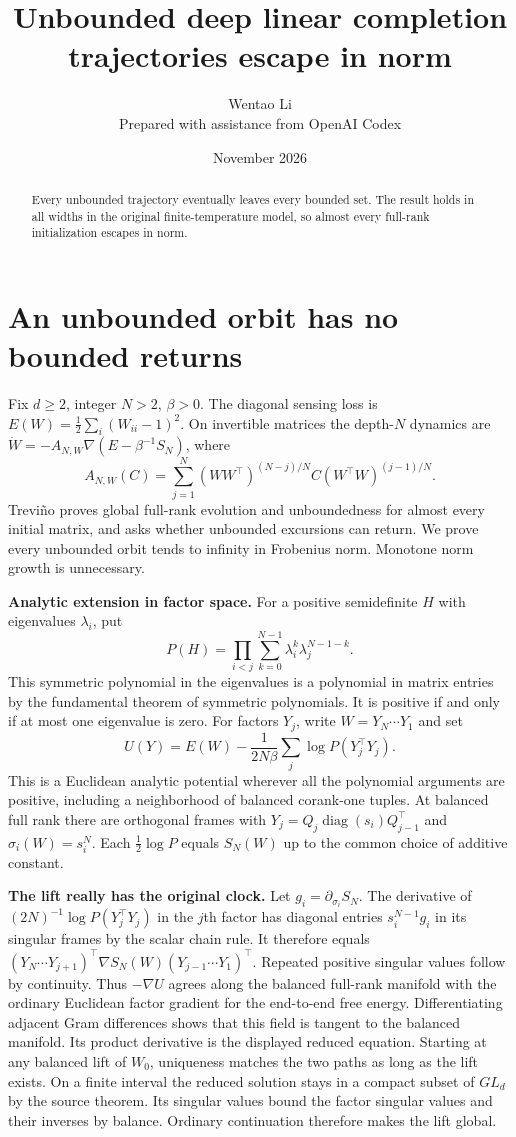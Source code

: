 \documentclass[10pt]{article}
\title{Unbounded deep linear completion trajectories escape in norm}
\author{Wentao Li\\{\small Prepared with assistance from OpenAI Codex}}
\date{November 2026}
\begin{document}
\maketitle
\begin{abstract}
Every unbounded trajectory eventually leaves every bounded set. The result holds in all widths in the original finite-temperature model, so almost every full-rank initialization escapes in norm.
\end{abstract}
\section*{An unbounded orbit has no bounded returns}
Fix $d\ge2$, integer $N>2$, $\beta>0$. The diagonal sensing loss is $E(W)=\tfrac12\sum_i(W_{ii}-1)^2$. On invertible matrices the depth-$N$ dynamics are $\dot W=-A_{N,W}\nabla(E-\beta^{-1}S_N)$, where
\[
 A_{N,W}(C)=\sum_{j=1}^N(WW^\top)^{(N-j)/N} C(W^\top W)^{(j-1)/N}.
\]
Treviño proves global full-rank evolution and unboundedness for almost every initial matrix, and asks whether unbounded excursions can return. We prove every unbounded orbit tends to infinity in Frobenius norm. Monotone norm growth is unnecessary.

\textbf{Analytic extension in factor space.} For a positive semidefinite $H$ with eigenvalues $\lambda_i$, put
\[
 P(H)=\prod_{i<j}\sum_{k=0}^{N-1}\lambda_i^k\lambda_j^{N-1-k}.
\]
This symmetric polynomial in the eigenvalues is a polynomial in matrix entries by the fundamental theorem of symmetric polynomials. It is positive if and only if at most one eigenvalue is zero. For factors $Y_j$, write $W=Y_N\cdots Y_1$ and set
\[
 U(Y)=E(W)-\frac{1}{2N\beta}\sum_j\log P(Y_j^\top Y_j).
\]
This is a Euclidean analytic potential wherever all the polynomial arguments are positive, including a neighborhood of balanced corank-one tuples. At balanced full rank there are orthogonal frames with $Y_j=Q_j\operatorname{diag}(s_i)Q_{j-1}^\top$ and $\sigma_i(W)=s_i^N$. Each $\frac12\log P$ equals $S_N(W)$ up to the common choice of additive constant.

\textbf{The lift really has the original clock.} Let $g_i=\partial_{\sigma_i} S_N$. The derivative of $(2N)^{-1}\log P(Y_j^\top Y_j)$ in the $j$th factor has diagonal entries $s_i^{N-1}g_i$ in its singular frames by the scalar chain rule. It therefore equals $(Y_N\cdots Y_{j+1})^\top \nabla S_N(W)(Y_{j-1}\cdots Y_1)^\top$. Repeated positive singular values follow by continuity. Thus $-\nabla U$ agrees along the balanced full-rank manifold with the ordinary Euclidean factor gradient for the end-to-end free energy. Differentiating adjacent Gram differences shows that this field is tangent to the balanced manifold. Its product derivative is the displayed reduced equation. Starting at any balanced lift of $W_0$, uniqueness matches the two paths as long as the lift exists. On a finite interval the reduced solution stays in a compact subset of $GL_d$ by the source theorem. Its singular values bound the factor singular values and their inverses by balance. Ordinary continuation therefore makes the lift global.
\end{document}

